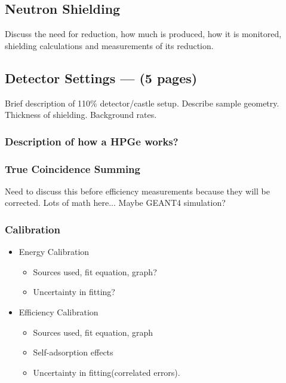 \documentclass[final,3p,times,twocolumn,authoryear]{elsarticle_modified}
\begin{document}
	\subsection{Neutron Shielding}
	Discuss the need for reduction, how much is produced, how it is monitored, shielding calculations and measurements of its reduction.

\subsection{Detector Settings --- (5 pages)}
\label{Gamma}
Brief description of 110\% detector/castle setup. Describe sample geometry. Thickness of shielding. Background rates.
\subsubsection{Description of how a HPGe works?} %
\subsubsection{True Coincidence Summing}
Need to discuss this before efficiency measurements because they will be corrected. Lots of math here... Maybe GEANT4 simulation?
\subsubsection{Calibration}
	\begin{itemize}
	\itemsep-0.2em 
	  \item Energy Calibration
	  	\begin{itemize}[topsep=-0pt]
		\itemsep-0.2em 
	  	\item Sources used, fit equation, graph?
	  	\item Uncertainty in fitting?
		\end{itemize}
	  \item Efficiency Calibration
	  	\begin{itemize}[topsep=-0pt]
		\itemsep-0.2em 
	  	\item Sources used, fit equation, graph
	  	\item Self-adsorption effects
	  	\item Uncertainty in fitting(correlated errors).
		\end{itemize}
	\end{itemize}
\end{document}
